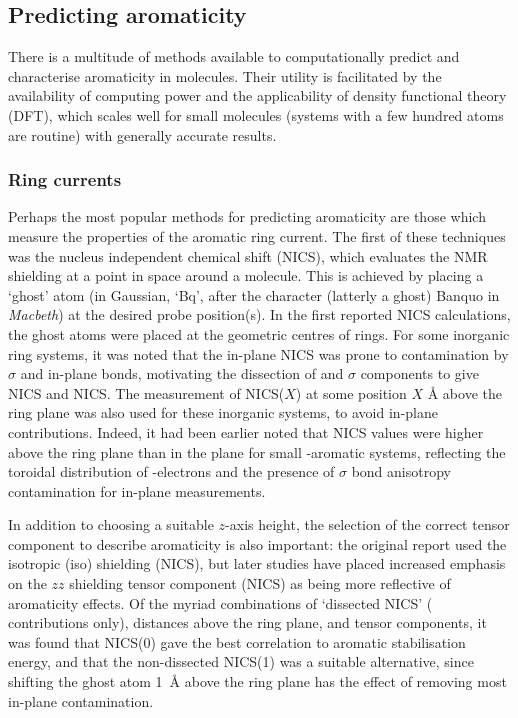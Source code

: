 	\subsection{Predicting aromaticity}

		There is a multitude of methods available to computationally predict and characterise aromaticity in molecules. Their utility is facilitated by the availability of computing power and the applicability of density functional theory (DFT), which scales well for small molecules (systems with a few hundred atoms are routine) with generally accurate results.



		\subsubsection{Ring currents}\label{sec:intro:rc}

			Perhaps the most popular methods for predicting aromaticity are those which measure the properties of the aromatic ring current. The first of these techniques was the nucleus independent chemical shift (NICS), which evaluates the NMR shielding at a point in space around a molecule. This is achieved by placing a `ghost' atom (in Gaussian, `Bq', after the character (latterly a ghost) Banquo\autocite{shakespeare1903macbeth} in \textit{Macbeth}) at the desired probe position(s). In the first reported NICS calculations, the ghost atoms were placed at the geometric centres of rings.\autocite{Schleyer1996} For some inorganic ring systems, it was noted that the in-plane NICS was prone to contamination by $\sigma$ and in-plane \pii bonds, motivating the dissection of \pii and $\sigma$ components to give NICS\tsub{\pii} and NICS\tsub{$\sigma$}.\autocite{Schleyer1997} The measurement of NICS($X$) at some position $X$ \si{\angstrom} above the ring plane was also used for these inorganic systems, to avoid in-plane contributions.\autocite{Schleyer1997} Indeed, it had been earlier noted that NICS values were higher above the ring plane than in the plane for small \pii{}-aromatic systems, reflecting the toroidal distribution of \pii{}-electrons and the presence of $\sigma$ bond anisotropy contamination for in-plane measurements.\autocite{Schleyer1996} 

			In addition to choosing a suitable $z$-axis height, the selection of the correct tensor component to describe aromaticity is also important: the original report used the isotropic (iso) shielding (NICS),\autocite{Schleyer1996} but later studies have placed increased emphasis on the $zz$ shielding tensor component (NICS) as being more reflective of aromaticity effects. Of the myriad combinations of `dissected NICS' ( \pii contributions only), distances above the ring plane, and tensor components, it was found that NICS(0) gave the best correlation to aromatic stabilisation energy, and that the non-dissected NICS(1) was a suitable alternative, since shifting the ghost atom \SI{1}{\angstrom} above the ring plane has the effect of removing most in-plane contamination.

